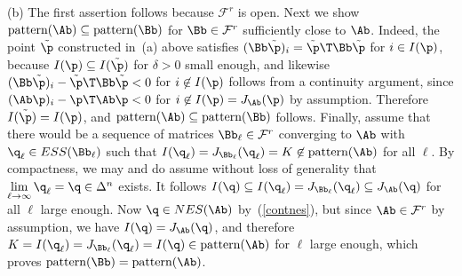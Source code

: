 \documentclass[moor]{informs3}              %
\def\reff#1{(\ref{#1})}
\begin{document}
(b) The first assertion follows because $\mathcal{F}^r$ is open.
Next we show $\textup{pattern}(\Ab)\subseteq \textup{pattern}(\Bb)$ for $\Bb\in \mathcal{F}^r$ sufficiently close to $\Ab$.
Indeed, the point $\tilde \p$ constructed in~(a) above satisfies $(\Bb\tilde \p)_i=\tilde\p\T\Bb\tilde \p$ for $i\in I(\p)$,
because $I(\p)\subseteq I(\tilde\p)$ for $\delta>0$ small enough, and likewise
$(\Bb\tilde \p)_i-\tilde\p\T\Bb\tilde \p<0$ for $i\not\in I(\p)$ follows from a continuity argument,
since $(\Ab\p)_i-\p\T\Ab\p<0$ for $i\not\in I(\p)=J_{\Ab}(\p)$ by assumption. Therefore $I(\tilde\p)=I(\p)$, and $\textup{pattern}(\Ab)\subseteq \textup{pattern}(\Bb)$ follows.
Finally, assume that there would be a sequence of matrices $\Bb_\ell\in\mathcal{F}^r$ converging to $\Ab$ with $\q_\ell\in ESS(\Bb_\ell)$ such that $I(\q_\ell) = J_{\Bb_\ell}(\q_\ell)= K\not\in\textup{pattern}(\Ab)$ for all $\ell$.
By compactness, we may and do assume without loss of generality that $\lim\limits_{\ell\to\infty}\q_\ell = \q\in \Delta^n$  exists. It follows $I(\q) \subseteq I(\q_\ell) = J_{\Bb_\ell}(\q_\ell) \subseteq J_{\Ab}(\q)$ for all $\ell$ large enough. Now $\q\in NES(\Ab)$ by~\reff{contnes}, but
since $\Ab\in \mathcal{F}^r$ by assumption, we have $I(\q)=J_{\Ab}(\q)$, and therefore $K=I(\q_\ell)=J_{\Bb_\ell}(\q_\ell)=I(\q)\in \textup{pattern}(\Ab)$ for $\ell$ large enough, which proves $\textup{pattern}(\Bb)=\textup{pattern}(\Ab)$. \ep
\end{document}
